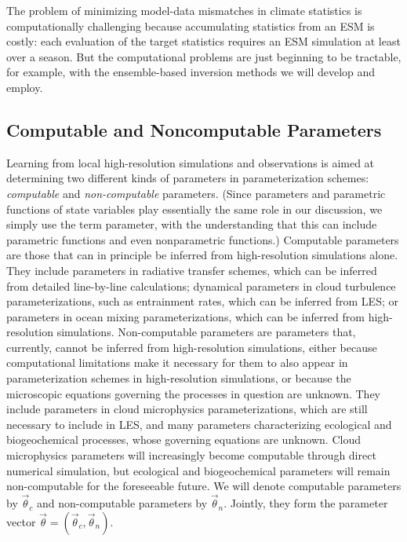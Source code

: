 \documentclass{article}
\begin{document}
The problem of minimizing model-data mismatches in climate statistics is computationally challenging because accumulating statistics from an ESM is costly: each evaluation of the target statistics requires an ESM simulation at least over a season. But the computational problems are just beginning to be tractable, for example, with the ensemble-based inversion methods we will develop and employ.

\subsection{Computable and Noncomputable Parameters}

Learning from  local high-resolution simulations and observations is aimed at determining two different kinds of parameters in parameterization schemes: \emph{computable} and \emph{non-computable} parameters. (Since parameters and parametric functions of state variables play essentially the same role in our discussion, we simply use the term parameter, with the understanding that this can include parametric functions and even nonparametric functions.) Computable parameters are those that can in principle be inferred from high-resolution simulations alone. They include parameters in radiative transfer schemes, which can be inferred from detailed line-by-line calculations; dynamical parameters in cloud turbulence parameterizations, such as entrainment rates, which can be inferred from LES; or parameters in ocean mixing parameterizations, which can be inferred from high-resolution simulations. Non-computable parameters are parameters that, currently, cannot be inferred from high-resolution simulations, either because computational limitations make it necessary for them to also appear in parameterization schemes in high-resolution simulations, or because the microscopic equations governing the processes in question are unknown. They include parameters in cloud microphysics parameterizations, which are still necessary to include in LES, and many parameters characterizing ecological and biogeochemical processes, whose governing equations are unknown. Cloud microphysics parameters will increasingly become computable through direct numerical simulation, but ecological and biogeochemical parameters will remain non-computable for the foreseeable future. We will denote computable parameters by $\vec{\theta}_c$ and non-computable parameters by $\vec{\theta}_n$. Jointly, they form the parameter vector $\vec{\theta}=(\vec{\theta}_c, \vec{\theta}_n)$.
\end{document}
